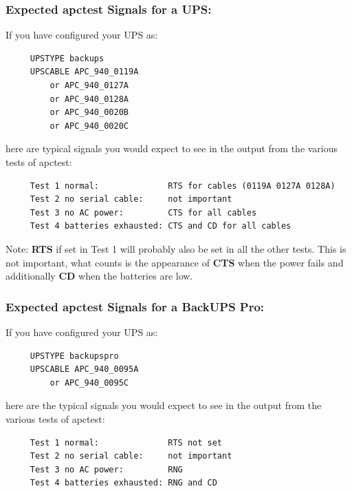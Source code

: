 {{{{{{{{{\label{Expected-apctest-Signals-for-a-UPS}

\subsubsection*{Expected apctest Signals for a UPS:}

\label{index-Testing-224}
\label{index-apctest-225}
If you have configured your UPS as: 

\footnotesize
\begin{verbatim}
     UPSTYPE backups
     UPSCABLE APC_940_0119A
         or APC_940_0127A
         or APC_940_0128A
         or APC_940_0020B
         or APC_940_0020C
\end{verbatim}
\normalsize

here are typical signals you would expect to see in the output from the
various tests of apctest: 

\footnotesize
\begin{verbatim}
     Test 1 normal:              RTS for cables (0119A 0127A 0128A)
     Test 2 no serial cable:     not important
     Test 3 no AC power:         CTS for all cables
     Test 4 batteries exhausted: CTS and CD for all cables
\end{verbatim}
\normalsize

Note: {\bf RTS} if set in Test 1 will probably also be set in all the other
tests. This is not important, what counts is the appearance of {\bf CTS} when
the power fails and additionally {\bf CD} when the batteries are low. 

\label{Expected-apctest-Signals-for-a-BackUPS-Pro}

\subsubsection*{Expected apctest Signals for a BackUPS Pro:}

\label{index-Testing-226}
\label{index-apctest-227}
If you have configured your UPS as: 

\footnotesize
\begin{verbatim}
     UPSTYPE backupspro
     UPSCABLE APC_940_0095A
         or APC_940_0095C
\end{verbatim}
\normalsize

here are the typical signals you would expect to see in the output from the
various tests of apctest: 

\footnotesize
\begin{verbatim}
     Test 1 normal:              RTS not set
     Test 2 no serial cable:     not important
     Test 3 no AC power:         RNG
     Test 4 batteries exhausted: RNG and CD
\end{verbatim}
\normalsize

}}}}}}}}}
